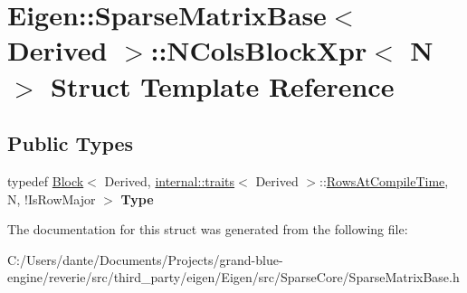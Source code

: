 \hypertarget{struct_eigen_1_1_sparse_matrix_base_1_1_n_cols_block_xpr}{}\section{Eigen\+::Sparse\+Matrix\+Base$<$ Derived $>$\+::N\+Cols\+Block\+Xpr$<$ N $>$ Struct Template Reference}
\label{struct_eigen_1_1_sparse_matrix_base_1_1_n_cols_block_xpr}
\subsection*{Public Types}
\begin{DoxyCompactItemize}
\item 
\mbox{\label{struct_eigen_1_1_sparse_matrix_base_1_1_n_cols_block_xpr_a5496bae9fad4c9667e632a64337c0e89}} 
typedef \mbox{\hyperlink{class_eigen_1_1_block}{Block}}$<$ Derived, \mbox{\hyperlink{struct_eigen_1_1internal_1_1traits}{internal\+::traits}}$<$ Derived $>$\+::\mbox{\hyperlink{class_eigen_1_1_sparse_matrix_base_a11b30ed44f64a137b4fa1ee638ca2d36a456cda7b9d938e57194036a41d634604}{Rows\+At\+Compile\+Time}}, N, !Is\+Row\+Major $>$ {\bfseries Type}
\end{DoxyCompactItemize}


The documentation for this struct was generated from the following file\+:\begin{DoxyCompactItemize}
\item 
C\+:/\+Users/dante/\+Documents/\+Projects/grand-\/blue-\/engine/reverie/src/third\+\_\+party/eigen/\+Eigen/src/\+Sparse\+Core/Sparse\+Matrix\+Base.\+h\end{DoxyCompactItemize}
